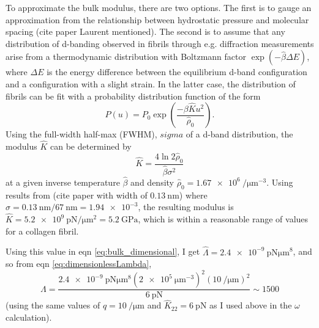 \documentclass[12pt]{article}
\begin{document}
To approximate the bulk modulus, there are two options. The first is to gauge an approximation from the relationship between hydrostatic pressure and molecular spacing (cite paper Laurent mentioned). The second is to assume that any distribution of d-banding observed in fibrils through e.g. diffraction measurements arise from a thermodynamic distribution with Boltzmann factor $\exp(-\hat{\beta}\Delta E)$, where $\Delta E$ is the energy difference between the equilibrium d-band configuration and a configuration with a slight strain. In the latter case, the distribution of fibrils can be fit with a probability distribution function of the form
\begin{equation}\label{eq:dbandpdf}
P(u)=P_0\exp\left(\frac{-\beta\hat{K}u^2}{\hat{\rho}_0}\right).
\end{equation}
Using the full-width half-max (FWHM), $sigma$ of a d-band distribution, the modulus $\hat{K}$ can be determined by
\begin{equation}\label{eq:FWHM}
\hat{K}=\frac{4\ln2\hat{\rho}_0}{\hat{\beta}\sigma^2}
\end{equation}
at a given inverse temperature $\hat{\beta}$ and density $\hat{\rho}_0=\SI{1.67e6}{\per\micro\meter^{-3}}$. Using results from (cite paper with width of $\SI{0.13}{\nano\meter}$) where $\sigma=\SI{0.13}{\nano\meter}/\SI{67}{\nano\meter}=\num{1.94e-3}$, the resulting modulus is $\hat{K}=\SI{5.2e9}{\pico\newton\per\micro\meter\squared}=\SI{5.2}{\giga\pascal}$, which is within a reasonable range of values for a collagen fibril.

Using this value in eqn \ref{eq:bulk_dimensional}, I get $\hat{\Lambda}=\SI{2.4e-9}{\pico\newton\micro\meter^8}$, and so from eqn \ref{eq:dimensionlessLambda}, \begin{equation}\label{eq:Lambda}
\Lambda=\frac{\SI{2.4e-9}{\pico\newton\micro\meter^8}(\SI{2e5}{\micro\meter^{-3}})^2(\SI{10}{\per\micro\meter})^2}{\SI{6}{\pico\newton}}\sim1500
\end{equation}
(using the same values of $\hat{q}=\SI{10}{\per\micro\meter}$ and $\hat{K}_{22}=\SI{6}{\pico\newton}$ as I used above in the $\omega$ calculation).
\clearpage


\end{document}
